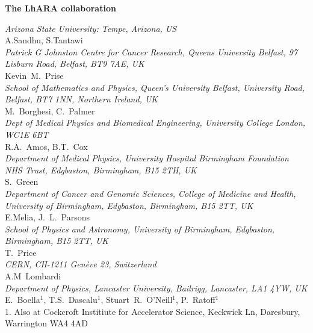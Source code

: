 \vspace{0.75cm}
\begin{center}
  {\bf \color{BlueViolet} The LhARA collaboration} \\
  \vspace{0.25cm}
\end{center}
\noindent \textit{Arizona State University: Tempe, Arizona, US} \\
A.Sandhu, S.Tantawi \\
 
\noindent \textit{Patrick G Johnston Centre for Cancer Research, Queens University Belfast, 97 Lisburn Road, Belfast, BT9 7AE, UK} \\
Kevin~M.~Prise \\
 
\noindent \textit{School of Mathematics and Physics, Queen's University Belfast, University Road, Belfast, BT7 1NN, Northern Ireland, UK} \\
M.~Borghesi, C.~Palmer \\
 
\noindent \textit{Dept of Medical Physics and Biomedical Engineering, University College London, WC1E 6BT} \\
R.A.~Amos, B.T.~Cox \\
 
\noindent \textit{Department of Medical Physics, University Hospital Birmingham Foundation NHS Trust, Edgbaston, Birmingham, B15 2TH, UK} \\
S.~Green \\
 
\noindent \textit{Department of Cancer and Genomic Sciences, College of Medicine and Health, University of Birmingham, Edgbaston, Birmingham, B15 2TT, UK} \\
E.Melia, J.~L.~Parsons \\
 
\noindent \textit{School of Physics and Astronomy, University of Birmingham, Edgbaston, Birmingham, B15 2TT, UK} \\
T.~Price \\
 
\noindent \textit{CERN, CH-1211 Genève 23, Switzerland} \\
A.M~Lombardi \\
 
\noindent \textit{Department of Physics, Lancaster University, Bailrigg, Lancaster, LA1 4YW, UK} \\
E.~Boella$^{1}$, T.S.~Dascalu$^{1}$, Stuart~R.~O'Neill$^{1}$, P.~Ratoff$^{1}$ \\
{\footnotesize
  1. Also at Cockcroft Institiute for Accelerator Science, Keckwick Ln, Daresbury, Warrington WA4 4AD \\
}
 
